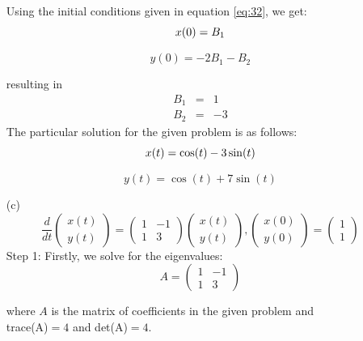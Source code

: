 \documentclass[12pt,a4paper]{article}
\begin{document}
\begin{enumerate}
   Using the initial conditions given in equation \eqref{eq:32}, we  get:
   \begin{equation}
   x(0)= B_1 \\
  \end{equation}

  \begin{equation}
    y(0)= -2B_1 -B_2
  \end{equation}

resulting in
  \begin{eqnarray*}
      B_1  &=& 1 \\
      B_2&=& -3
   \end{eqnarray*}
The particular solution for the given problem is as follows:
  \begin{equation}
    x(t)= \cos(t) - 3\sin(t) \\
  \end{equation}

    \begin{equation}
        y(t)=\cos(t) + 7 \sin(t)
    \end{equation} 
 
   \item[(c)]
       \begin{equation}
       			\frac{d}{dt}   \begin{pmatrix} x(t) \\ y(t) \end{pmatrix} 
							 =  \begin{pmatrix}
											1 & -1\\
											1 & 3
									\end{pmatrix} \begin{pmatrix} x(t) \\ y(t) \end{pmatrix},  \begin{pmatrix}  x(0) \\ y(0)        				\end{pmatrix}   =  \begin{pmatrix}  1  \\  1 \end{pmatrix} 
					\label{eq:33}
       \end{equation}
     Step 1: Firstly,  we solve for the eigenvalues:
      \[ 
        A=\begin{pmatrix} 1 & -1 \\ 1 & 3 \end{pmatrix} 
      \]
	
    where $A$  is the matrix  of coefficients in the given problem and\\
    trace(A)$=4$ and det(A)$=4$. 


\end{enumerate}
\end{document}
